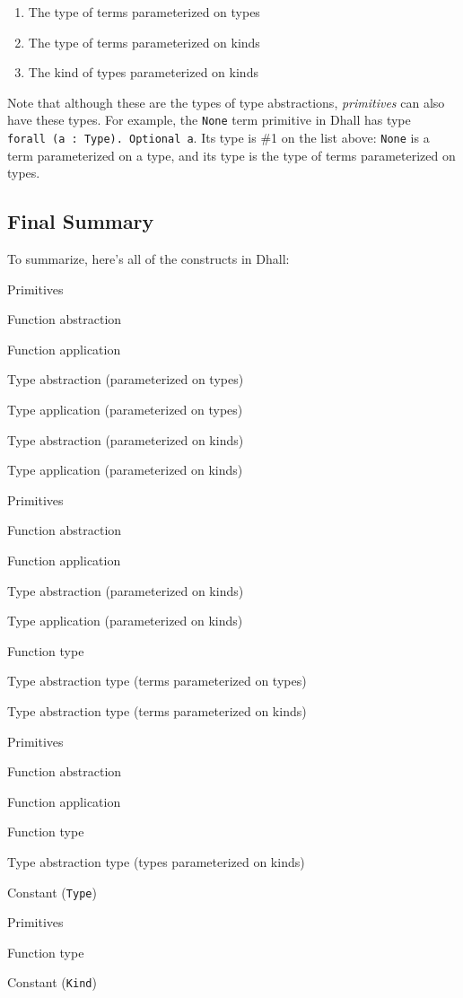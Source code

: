 \documentclass[]{article}
\begin{document}
\begin{enumerate}
\def\labelenumi{\arabic{enumi}.}
\tightlist
\item
  The type of terms parameterized on types
\item
  The type of terms parameterized on kinds
\item
  The kind of types parameterized on kinds
\end{enumerate}

Note that although these are the types of type abstractions, \emph{primitives}
can also have these types. For example, the \texttt{None} term primitive in
Dhall has type \texttt{forall\ (a\ :\ Type).\ Optional\ a}. Its type is \#1 on
the list above: \texttt{None} is a term parameterized on a type, and its type is
the type of terms parameterized on types.

\hypertarget{final-summary}{%
\subsection{Final Summary}\label{final-summary}}

To summarize, here's all of the constructs in Dhall:

\begin{description}
\tightlist
\item[Term]
Primitives

Function abstraction

Function application

Type abstraction (parameterized on types)

Type application (parameterized on types)

Type abstraction (parameterized on kinds)

Type application (parameterized on kinds)
\item[Type]
Primitives

Function abstraction

Function application

Type abstraction (parameterized on kinds)

Type application (parameterized on kinds)

Function type

Type abstraction type (terms parameterized on types)

Type abstraction type (terms parameterized on kinds)
\item[Kind]
Primitives

Function abstraction

Function application

Function type

Type abstraction type (types parameterized on kinds)

Constant (\texttt{Type})
\item[Sort]
Primitives

Function type

Constant (\texttt{Kind})
\end{description}
\end{document}
